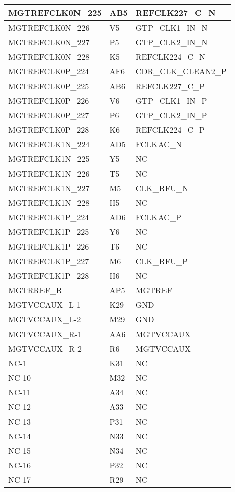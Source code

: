 \begin{footnotesize}
\begin{longtable}{|p{7cm}|p{1cm}|p{5cm}|}
MGTREFCLK0N\_225	&	AB5	&	REFCLK227\_C\_N	\\ \hline
MGTREFCLK0N\_226	&	V5	&	GTP\_CLK1\_IN\_N	\\ \hline
MGTREFCLK0N\_227	&	P5	&	GTP\_CLK2\_IN\_N	\\ \hline
MGTREFCLK0N\_228	&	K5	&	REFCLK224\_C\_N	\\ \hline
MGTREFCLK0P\_224	&	AF6	&	CDR\_CLK\_CLEAN2\_P	\\ \hline
MGTREFCLK0P\_225	&	AB6	&	REFCLK227\_C\_P	\\ \hline
MGTREFCLK0P\_226	&	V6	&	GTP\_CLK1\_IN\_P	\\ \hline
MGTREFCLK0P\_227	&	P6	&	GTP\_CLK2\_IN\_P	\\ \hline
MGTREFCLK0P\_228	&	K6	&	REFCLK224\_C\_P	\\ \hline
MGTREFCLK1N\_224	&	AD5	&	FCLKAC\_N	\\ \hline
MGTREFCLK1N\_225	&	Y5	&	NC	\\ \hline
MGTREFCLK1N\_226	&	T5	&	NC	\\ \hline
MGTREFCLK1N\_227	&	M5	&	CLK\_RFU\_N	\\ \hline
MGTREFCLK1N\_228	&	H5	&	NC	\\ \hline
MGTREFCLK1P\_224	&	AD6	&	FCLKAC\_P	\\ \hline
MGTREFCLK1P\_225	&	Y6	&	NC	\\ \hline
MGTREFCLK1P\_226	&	T6	&	NC	\\ \hline
MGTREFCLK1P\_227	&	M6	&	CLK\_RFU\_P	\\ \hline
MGTREFCLK1P\_228	&	H6	&	NC	\\ \hline
MGTRREF\_R	&	AP5	&	MGTREF	\\ \hline
MGTVCCAUX\_L-1	&	K29	&	GND	\\ \hline
MGTVCCAUX\_L-2	&	M29	&	GND	\\ \hline
MGTVCCAUX\_R-1	&	AA6	&	MGTVCCAUX	\\ \hline
MGTVCCAUX\_R-2	&	R6	&	MGTVCCAUX	\\ \hline
NC-1	&	K31	&	NC	\\ \hline
NC-10	&	M32	&	NC	\\ \hline
NC-11	&	A34	&	NC	\\ \hline
NC-12	&	A33	&	NC	\\ \hline
NC-13	&	P31	&	NC	\\ \hline
NC-14	&	N33	&	NC	\\ \hline
NC-15	&	N34	&	NC	\\ \hline
NC-16	&	P32	&	NC	\\ \hline
NC-17	&	R29	&	NC	\\ \hline

\end{longtable}
\end{footnotesize}
